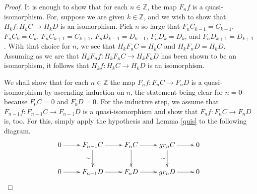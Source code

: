 \documentclass{article}
\begin{document}
\begin{proof}
  It is enough to show that for each $n \in \mathbb Z$, the map $F_n f$ is a
  quasi-isomorphism.  For, suppose we are given $k \in \mathbb Z$, and we
  wish to show that $H_k f : H_k C \to H_k D$ is an isomorphism.  Pick $n$ so
  large that $F_n C_{k-1} = C_{k-1}$, $F_n C_{k} = C_{k}$, $F_n C_{k+1} =
  C_{k+1}$, $F_n D_{k-1} = D_{k-1}$, $F_n D_{k} = D_{k}$, and $F_n D_{k+1} =
  D_{k+1}$.  With that choice for $n$, we see that $H_k F_n C = H_k C$ and
  $H_k F_n D = H_k D$.  Assuming as we are that $H_k F_n f : H_k F_n C \to
  H_k F_n D$ has been shown to be an isomorphism, it follows that $H_k f :
  H_k C \to H_k D$ is an isomorphism.
  
  We shall show that for each $n \in \mathbb Z$ the map $F_n f : F_n C \to
  F_n D$ is a quasi-isomorphism by ascending induction on $n$, the statement
  being clear for $n=0$ because $F_0 C = 0$ and $F_0 D = 0$.  For the
  inductive step, we assume that $F_{n-1} f : F_{n-1} C \to F_{n-1} D$ is a
  quasi-isomorphism and show that $F_{n} f : F_{n} C \to F_{n} D$ is, too.
  For this, simply apply the hypothesis and Lemma \ref{quis} to the
  following diagram.
  \begin{equation}
    \xymatrix{
      0 \ar[r] & F_{n-1} C  \ar[d]_\sim \ar[r] & F_n C  \ar[d]\ar[r] & gr_n C  \ar[d]_\sim\ar[r] & 0 \\
      0 \ar[r] & F_{n-1} D \ar[r] & F_n D \ar[r] & gr_n D \ar[r] & 0 
      }
  \end{equation}
\end{proof}
\end{document}
